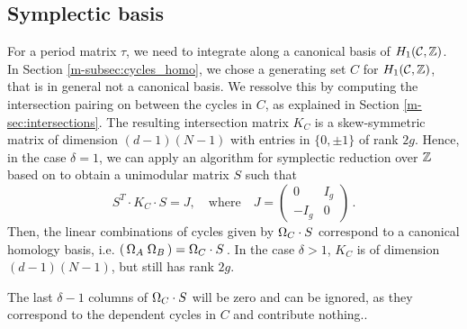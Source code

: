 \documentclass[main.tex]{subfiles}
\begin{document}
  \subsection{Symplectic basis}\label{subsec:symp_basis}
  
  For a period matrix $\tau$, we need to integrate along a canonical basis of $H_1(\mathcal{C},\mathbb{Z})$. In Section \ref{m-subsec:cycles_homo}, we chose a generating set $C$ for $H_1(\mathcal{C},\mathbb{Z})$, that is in general not 
  a canonical basis. \abstand We 
  ressolve this by computing the intersection pairing on between the cycles in $C$, as explained in Section \ref{m-sec:intersections}. The resulting intersection matrix $K_C$
   is a skew-symmetric matrix of dimension $(d-1)(N-1)$ with entries in $\{ 0,\pm 1\}$ of rank $2g$. Hence, in the case $\delta = 1$, we can apply an algorithm 
  for symplectic reduction over $\mathbb{Z}$ based on
    \cite[Theorem 18]{KB2002} to obtain a unimodular matrix $S$ such that
  $$S^T \cdot K_C \cdot S = J, \quad \text{where} \quad J = \begin{pmatrix} 0 & I_g \\ -I_g & 0 \end{pmatrix}\,.$$
  Then, the linear combinations of cycles given by $\Omega_C \cdot S$ correspond to a canonical homology basis, i.e. $( \, \Omega_A \; \Omega_B \, ) = \Omega_C \cdot S$\,.
  In the case $\delta > 1$, $K_C$ is of dimension $(d-1)(N-1)$, but still has rank $2g$. 
  
  The last $\delta-1$ columns of $\Omega_C \cdot S$ will be zero and can be ignored, as they correspond to the dependent cycles
  in $C$ and contribute nothing..
  
 
\biblio
\end{document}
